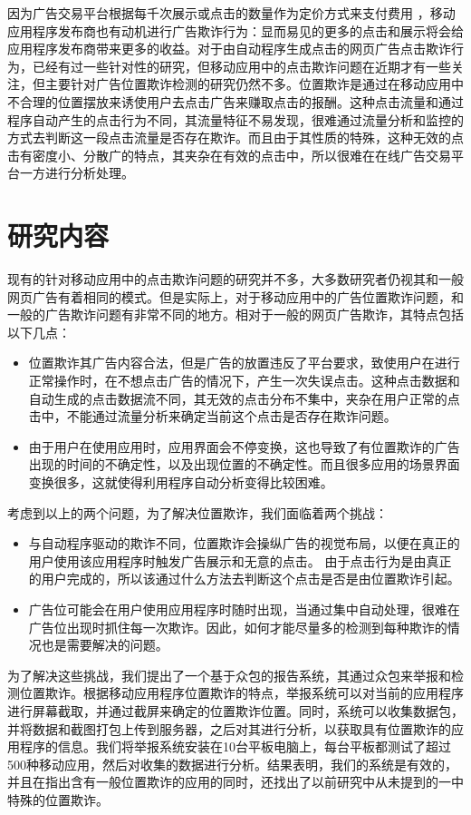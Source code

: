 因为广告交易平台根据每千次展示或点击的数量作为定价方式来支付费用\cite{metwally2005duplicate} ，移动应用程序发布商也有动机进行广告欺诈行为：显而易见的更多的点击和展示将会给应用程序发布商带来更多的收益。对于由自动程序生成点击的网页广告点击欺诈行为，已经有过一些针对性的研究\cite{blizard2012click}\cite{miller2011s}，但移动应用中的点击欺诈问题在近期才有一些关注，但主要针对广告位置欺诈检测的研究仍然不多。位置欺诈是通过在移动应用中不合理的位置摆放来诱使用户去点击广告来赚取点击的报酬。这种点击流量和通过程序自动产生的点击行为不同，其流量特征不易发现，很难通过流量分析和监控的方式去判断这一段点击流量是否存在欺诈。而且由于其性质的特殊，这种无效的点击有密度小、分散广的特点，其夹杂在有效的点击中，所以很难在在线广告交易平台一方进行分析处理。

\section{研究内容}

现有的针对移动应用中的点击欺诈问题的研究并不多，大多数研究者仍视其和一般网页广告有着相同的模式。但是实际上，对于移动应用中的广告位置欺诈问题，和一般的广告欺诈问题有非常不同的地方。相对于一般的网页广告欺诈，其特点包括以下几点：
\begin{itemize}
    \item 位置欺诈其广告内容合法，但是广告的放置违反了平台要求，致使用户在进行正常操作时，在不想点击广告的情况下，产生一次失误点击。这种点击数据和自动生成的点击数据流不同，其无效的点击分布不集中，夹杂在用户正常的点击中，不能通过流量分析来确定当前这个点击是否存在欺诈问题。
    \item 由于用户在使用应用时，应用界面会不停变换，这也导致了有位置欺诈的广告出现的时间的不确定性，以及出现位置的不确定性。而且很多应用的场景界面变换很多，这就使得利用程序自动分析变得比较困难。
\end{itemize}

考虑到以上的两个问题，为了解决位置欺诈，我们面临着两个挑战：
\begin{itemize}
    \item 与自动程序驱动的欺诈不同，位置欺诈会操纵广告的视觉布局，以便在真正的用户使用该应用程序时触发广告展示和无意的点击。 由于点击行为是由真正的用户完成的，所以该通过什么方法去判断这个点击是否是由位置欺诈引起。
    \item 广告位可能会在用户使用应用程序时随时出现，当通过集中自动处理，很难在广告位出现时抓住每一次欺诈。因此，如何才能尽量多的检测到每种欺诈的情况也是需要解决的问题。
\end{itemize}

为了解决这些挑战，我们提出了一个基于众包的报告系统，其通过众包来举报和检测位置欺诈。根据移动应用程序位置欺诈的特点，举报系统可以对当前的应用程序进行屏幕截取，并通过截屏来确定的位置欺诈位置。同时，系统可以收集数据包，并将数据和截图打包上传到服务器，之后对其进行分析，以获取具有位置欺诈的应用程序的信息。我们将举报系统安装在10台平板电脑上，每台平板都测试了超过500种移动应用，然后对收集的数据进行分析。结果表明，我们的系统是有效的，并且在指出含有一般位置欺诈的应用的同时，还找出了以前研究中从未提到的一中特殊的位置欺诈。

